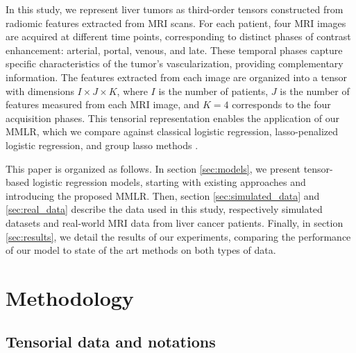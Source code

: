 \documentclass[preprint,12pt]{elsarticle}
\begin{document}
In this study, we represent liver tumors as third-order tensors constructed from radiomic features extracted from MRI scans. For each patient, four MRI images are acquired at different time points, corresponding to distinct phases of contrast enhancement: arterial, portal, venous, and late. These temporal phases capture specific characteristics of the tumor's vascularization, providing complementary information. The features extracted from each image are organized into a tensor with dimensions \( I \times J \times K \), where \( I \) is the number of patients, \( J \) is the number of features measured from each MRI image, and \( K = 4 \) corresponds to the four acquisition phases. This tensorial representation enables the application of our MMLR, which we compare against classical logistic regression, lasso-penalized logistic regression, and group lasso methods \cite{grp_lasso}.

This paper is organized as follows. In section \ref{sec:models}, we present tensor-based logistic regression models, starting with existing approaches and introducing the proposed MMLR. Then, section \ref{sec:simulated_data} and \ref{sec:real_data} describe the data used in this study, respectively simulated datasets and real-world MRI data from liver cancer patients. Finally, in section \ref{sec:results}, we detail the results of our experiments, comparing the performance of our model to state of the art methods on both types of data. 


\section{Methodology}

\subsection{Tensorial data and notations}
\end{document}
